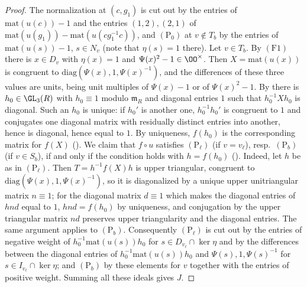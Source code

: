 \begin{proof}
The normalization at $(c,g_1)$ is cut out by the entries of $\mathrm{mat}(u(c))-1$ and the entries $(1,2),(2,1)$ of
$\mathrm{mat}(u(g_1))-\mathrm{mat}(u(cg_1^{-1}c))$, and $(\mathrm P_0)$ at $v\notin T_b$ by the entries of $\mathrm{mat}(u(s))-1$, $s\in N_v$
(note that $\eta(s)=1$ there). Let $v\in T_b$. By $(\mathrm{F1})$ there is $x\in D_v$ with $\eta(x)=1$ and $\Psi(x)^2-1\in\OO^\times$. Then
$X=\mathrm{mat}(u(x))$ is congruent to $\mathrm{diag}(\Psi(x),1,\Psi(x)^{-1})$, and the differences of these three values are units, being unit
multiples of $\Psi(x)-1$ or of $\Psi(x)^2-1$. By  there is
$h_0\in\GL_3(R)$ with $h_0\equiv1$ modulo $\mathfrak m_R$ and diagonal entries $1$ such that $h_0^{-1}Xh_0$ is diagonal. Such an $h_0$ is
unique: if $h_0'$ is another one, $h_0^{-1}h_0'$ is congruent to $1$ and conjugates one diagonal matrix with residually distinct entries
into another, hence is diagonal, hence equal to $1$. By uniqueness, $f(h_0)$ is the corresponding matrix for $f(X)$
(). We claim that $f\circ u$ satisfies $(\mathrm P_\ell)$ (if $v=v_\ell$),
resp.\ $(\mathrm P_b)$ (if $v\in S_b$), if and only if the condition holds with $h=f(h_0)$
(). Indeed, let $h$ be as in $(\mathrm P_\ell)$. Then
$T=h^{-1}f(X)h$ is upper triangular, congruent to $\mathrm{diag}(\Psi(x),1,\Psi(x)^{-1})$, so it is diagonalized by a unique upper
unitriangular matrix $n\equiv1$; for the diagonal matrix $d\equiv1$ which makes the diagonal entries of $hnd$ equal to $1$, $hnd=f(h_0)$ by
uniqueness, and conjugation by the upper triangular matrix $nd$ preserves upper triangularity and the diagonal entries. The same
argument applies to $(\mathrm P_b)$. Consequently $(\mathrm P_\ell)$ is cut out by the entries of negative weight of
$h_0^{-1}\mathrm{mat}(u(s))h_0$ for $s\in D_{v_\ell}\cap\ker\eta$ and by the differences between the diagonal entries of
$h_0^{-1}\mathrm{mat}(u(s))h_0$ and $\Psi(s),1,\Psi(s)^{-1}$ for $s\in I_{v_\ell}\cap\ker\eta$; and $(\mathrm P_b)$ by these elements for $v$ together
with the entries of positive weight. Summing all these ideals gives $J$.
\end{proof}

